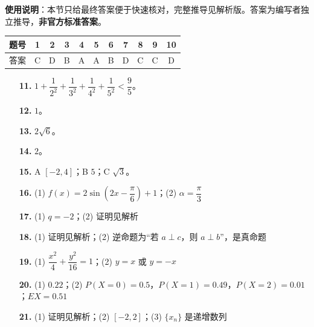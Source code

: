 
\begin{gknotice}
\textbf{使用说明}：本节只给最终答案便于快速核对，完整推导见解析版。答案为编写者独立推导，\textbf{非官方标准答案}。
\end{gknotice}

\begin{center}\begin{tabular}{ccccccccccc}
\toprule
题号 & 1 & 2 & 3 & 4 & 5 & 6 & 7 & 8 & 9 & 10 \\
\midrule
答案 & C & D & B & A & A & B & D & C & C & D \\
\bottomrule
\end{tabular}\end{center}

\begin{itemize}[leftmargin=2.6em]
  \item[\textbf{11.}] $1+\dfrac1{2^2}+\dfrac1{3^2}+\dfrac1{4^2}+\dfrac1{5^2}<\dfrac95$。
  \item[\textbf{12.}] $1$。
  \item[\textbf{13.}] $2\sqrt6$。
  \item[\textbf{14.}] $2$。
  \item[\textbf{15.}] A $[-2,4]$；B $5$；C $\sqrt3$。
\end{itemize}

\begin{itemize}[leftmargin=2.6em]
  \item[\textbf{16.}] (1) $f(x)=2\sin\left(2x-\dfrac\pi6\right)+1$；(2) $\alpha=\dfrac\pi3$
  \item[\textbf{17.}] (1) $q=-2$；(2) 证明见解析
  \item[\textbf{18.}] (1) 证明见解析；(2) 逆命题为“若 $a\perp c$，则 $a\perp b$”，是真命题
  \item[\textbf{19.}] (1) $\dfrac{x^2}4+\dfrac{y^2}{16}=1$；(2) $y=x$ 或 $y=-x$
  \item[\textbf{20.}] (1) $0.22$；(2) $P(X=0)=0.5$，$P(X=1)=0.49$，$P(X=2)=0.01$；$EX=0.51$
  \item[\textbf{21.}] (1) 证明见解析；(2) $[-2,2]$；(3) $\{x_n\}$ 是递增数列
\end{itemize}
